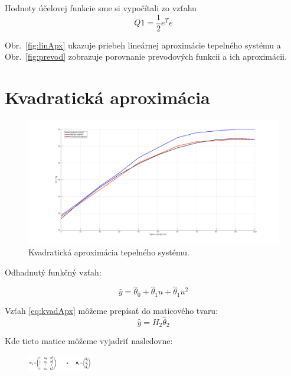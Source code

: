 \documentclass{article}
\begin{document}
Hodnoty účelovej funkcie sme si vypočítali zo vzťahu 
\begin{equation}
	Q1 = \frac{1}{2} e^Te
	\label{eq:objFunkcia}
\end{equation}

Obr.~\ref{fig:linApx} ukazuje priebeh lineárnej aproximácie tepelného systému a
Obr.~\ref{fig:prevod} zobrazuje porovnanie prevodových funkcii a ich aproximácii.


\clearpage

\section{Kvadratická aproximácia}
\label{sec:kvad}

\begin{figure}[!htbp]
	\begin{center}
		\includegraphics[width=\textwidth]{include/kvadraticka_regresia.png}
	\end{center}
	\caption{Kvadratická aproximácia tepelného systému.}
	\label{fig:kvadApx}
\end{figure}

Odhadnutý funkčný vzťah:

\begin{equation}
	\hat{y} = \hat{\theta}_0 + \hat{\theta}_1u + \hat{\theta}_1u^2
	\label{eq:kvadApx}
\end{equation}

Vzťah \ref{eq:kvadApx} môžeme prepísať do maticového tvaru:
\begin{equation}
	\hat{y} = H_2\hat{\theta}_2
	\label{eq:kvadApx2}
\end{equation}

Kde tieto matice môžeme vyjadriť nasledovne:

\begin{figure}[!htbp]
	\begin{center}
		\includegraphics[width=0.25\textwidth]{include/defHandTheta2.png}
	\end{center}
\end{figure}
\end{document}
